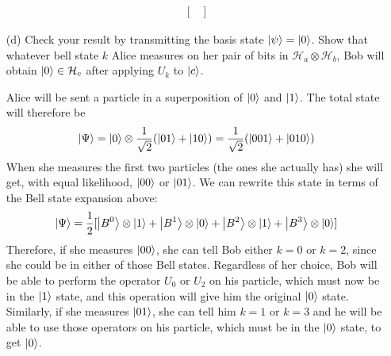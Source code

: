 \documentclass[a4paper,twoside]{article}
\begin{document}
\begin{itemize}
\begin{tcolorbox}[breakable]
\begin{align}
\begin{bmatrix}
                \end{bmatrix}
            \end{align}
        \end{tcolorbox}
    \item[(d)] Check your result by transmitting the basis state $ \ket{\psi} = \ket{0} $. Show that whatever bell state $ k $ Alice measures on her pair of bits in $ \mathcal{H}_{a} \otimes \mathcal{H}_{b} $, Bob will obtain $ \ket{0} \in \mathcal{H}_{c} $ after applying $ U_k $ to $ \ket{c} $.
        \begin{tcolorbox}[breakable]
            Alice will be sent a particle in a superposition of $ \ket{0} $ and $ \ket{1} $. The total state will therefore be
            \begin{equation}
                \ket{\Psi} = \ket{0} \otimes \frac{1}{\sqrt{2}} (\ket{01} + \ket{10}) = \frac{1}{\sqrt{2}} (\ket{001} + \ket{010})
            \end{equation}
            When she measures the first two particles (the ones she actually has) she will get, with equal likelihood, $ \ket{00} $ or $ \ket{01} $. We can rewrite this state in terms of the Bell state expansion above:
            \begin{equation}
                \ket{\Psi} = \frac{1}{2} [\ket{B^0} \otimes \ket{1} + \ket{B^1} \otimes \ket{0} + \ket{B^2} \otimes \ket{1} + \ket{B^3} \otimes \ket{0}]
            \end{equation}
            Therefore, if she measures $ \ket{00} $, she can tell Bob either $ k = 0 $ or $ k = 2 $, since she could be in either of those Bell states. Regardless of her choice, Bob will be able to perform the operator $ U_0 $ or $ U_2 $ on his particle, which must now be in the $ \ket{1} $ state, and this operation will give him the original $ \ket{0} $ state. Similarly, if she measures $ \ket{01} $, she can tell him $ k = 1 $ or $ k = 3 $ and he will be able to use those operators on his particle, which must be in the $ \ket{0} $ state, to get $ \ket{0} $.
        \end{tcolorbox}

\end{itemize}
\end{document}

